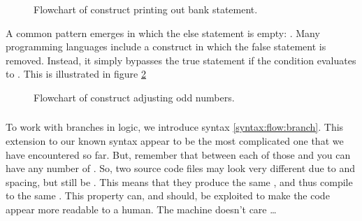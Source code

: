 %  

\begin{figure}[tbp]
  
  \caption{Flowchart of  construct printing out bank statement.}
  \label{fig:flow:branch:else}
\end{figure}

A common pattern emerges in which the else statement is empty: . Many programming languages include a construct in which the false statement is removed. Instead, it simply bypasses the true statement if the condition evaluates to . This is illustrated in figure \ref{fig:flow:branch:if}

\begin{figure}[tbp]
  
  \caption{Flowchart of  construct adjusting odd numbers.}
  \label{fig:flow:branch:if}
\end{figure}

\subsubsection{\csharp}

To work with branches in logic, we introduce syntax \ref{syntax:flow:branch}. This extension to our known syntax appear to be the most complicated one that we have encountered so far. But, remember that between each of those  and  you can have any number of . So, two source code files may look very different due to  and spacing, but still be . This means that they produce the same , and thus compile to the same . This property can, and should, be exploited to make the code appear more readable to a human. The machine doesn't care \ldots

